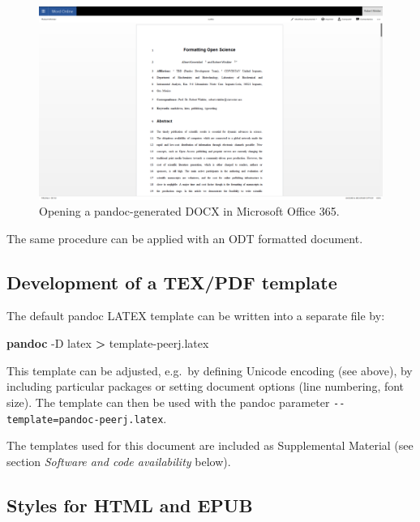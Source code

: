 \documentclass[10pt,fleqn]{wlpeerj}
\newenvironment{Shaded}{}{}
\newcommand{\KeywordTok}[1]{\textcolor[rgb]{0.00,0.44,0.13}{\textbf{{#1}}}}
\newcommand{\NormalTok}[1]{{#1}}
\begin{document}
\begin{figure}[htbp]
\centering
\includegraphics{Fig8.png}
\caption{Opening a pandoc-generated DOCX in Microsoft Office 365.}
\end{figure}

The same procedure can be applied with an ODT formatted document.

\subsection{Development of a TEX/PDF
template}\label{development-of-a-texpdf-template}

The default pandoc LATEX template can be written into a separate file
by:

\begin{Shaded}
\begin{Highlighting}[]
\KeywordTok{pandoc} \NormalTok{-D latex }\KeywordTok{>} \NormalTok{template-peerj.latex}
\end{Highlighting}
\end{Shaded}

This template can be adjusted, e.g.~by defining Unicode encoding (see
above), by including particular packages or setting document options
(line numbering, font size). The template can then be used with the
pandoc parameter \texttt{-\/-template=pandoc-peerj.latex}.

The templates used for this document are included as Supplemental
Material (see section \emph{Software and code availability} below).

\subsection{Styles for HTML and EPUB}\label{styles-for-html-and-epub}
\end{document}
